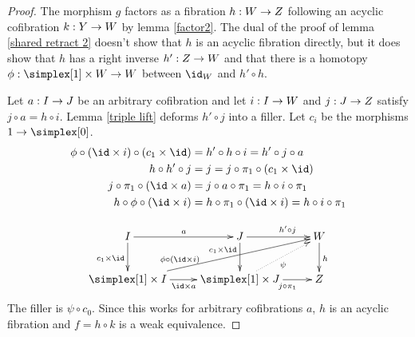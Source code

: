 \documentclass[csh.tex]{subfiles}
\begin{document}
\begin{proof} 

The morphism $g$ factors as a fibration $h: W\to Z$ following an acyclic cofibration $k: Y\to W$ by lemma \ref{factor2}. The dual of the proof of lemma \ref{shared retract 2} doesn't show that $h$ is an acyclic fibration directly, but it does show that $h$ has a right inverse $h': Z\to W$ and that there is a homotopy $\phi\of\simplex[1]\times W\to W$ between $\id_W$ and $h'\circ h$.

Let $a: I\to J$ be an arbitrary cofibration and let $i: I\to W$ and $j: J\to Z$ satisfy $j\circ a=h\circ i$. Lemma \ref{triple lift} deforms $h'\circ j$ into a filler. Let $c_i$ be the morphisms $1\to \simplex[0]$.
\begin{align*}
\phi\circ(\id\times i)\circ (c_1\times \id) &= h'\circ h\circ i = h'\circ j\circ a \\
h\circ h' \circ j &= j = j\circ \pi_1\circ(c_1\times\id) \\
j\circ \pi_1\circ (\id\times a) &= j\circ a\circ \pi_1 = h\circ i \circ \pi_1\\
h\circ \phi\circ(\id\times i) &= h \circ \pi_1 \circ (\id\times i) = h\circ i \circ \pi_1
\end{align*}

\[\xymatrix{
I\ar[r]^{a}\ar[d]_{c_1\times \id} & J\ar[r]^(.6){h'\circ j}\ar[d]_(.3){c_1\times\id} & W\ar[d]^h\\
\simplex[1]\times I\ar[r]_{\id\times a}\ar[urr]^(.3){\phi\circ(\id\times i)} & \simplex[1]\times J\ar[r]_(.6){j\circ \pi_1}\ar@{.>}[ur]_{\psi} & Z
}\]
The filler is $\psi\circ c_0$. Since this works for arbitrary cofibrations $a$, $h$ is an acyclic fibration and $f = h\circ k$ is a weak equivalence.
\end{proof}
\end{document}
